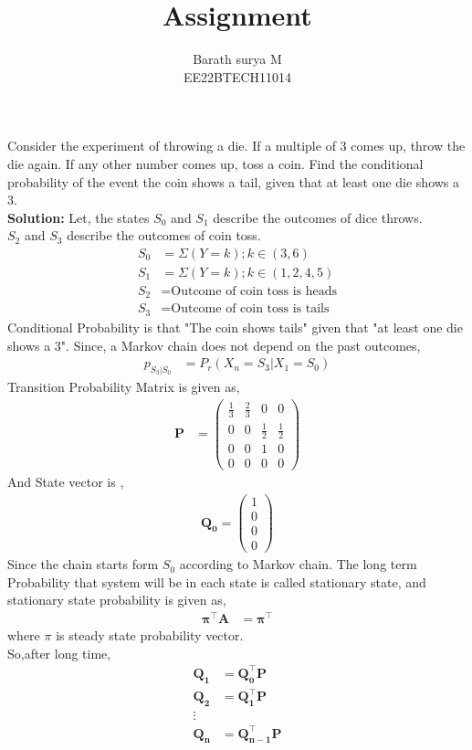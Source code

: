 \documentclass[journal,12pt,two column]{IEEEtran}
\title{Assignment}
\author{Barath surya M \\ EE22BTECH11014}
\providecommand{\brak}[1]{\ensuremath{\left(#1\right)}}
\newcommand{\solution}{\noindent \textbf{Solution: }}
\newcommand{\myvec}[1]{\ensuremath{\begin{pmatrix}#1\end{pmatrix}}}
\let\vec\mathbf
\begin{document}
\maketitle
Consider the experiment of throwing a die. If a multiple of 3 comes up, throw the die again. If any other number comes up, toss a coin. Find the conditional probability of the event the coin shows a tail, given that  at least one die shows a 3.\\
\solution
Let, the states $S_0$ and $S_1$ describe the outcomes of dice throws.\\
$S_2$ and $S_3$ describe the outcomes of coin toss.
\begin{align}
    S_0 &= \Sigma{\brak{Y=k}} ;k\in{\brak{3,6}}\\
    S_1 &= \Sigma{\brak{Y=k}} ; k\in{\brak{1,2,4,5}}\\
    S_2 &= \text{Outcome of coin toss is heads}\\
    S_3 &= \text{Outcome of coin toss is tails}
\end{align}
Conditional Probability is that "The coin shows tails" given that "at least one die shows a 3".
Since, a Markov chain does not depend on the past outcomes,
\begin{align}
    p_{S_3 | S_0}&=P_r\brak{X_n=S_3|X_1 =S_0}
\end{align}
Transition Probability Matrix is given as,
\begin{align}
    \vec{P}&=\myvec{\frac{1}{3}&\frac{2}{3}&0&0\\
                0&0&\frac{1}{2}&\frac{1}{2}\\
                0&0&1&0\\
                0&0&0&0
                }
\end{align}
And State vector is ,
\begin{align}
    \vec{Q_0}=\myvec{1\\0\\0\\0}
\end{align}
Since the chain starts form $S_0$ according to Markov chain.
The long term Probability that system will be in each state is called stationary state, and stationary state probability is given as,
\begin{align}
    \vec{\pi^{\top}A}&=\vec{\pi^{\top}}
\end{align}
where $\pi$ is steady state probability vector.\\So,after long time,
\begin{align}
    \vec{Q_1}&=\vec{Q_0^{\top} P}\\
    \vec{Q_2}&=\vec{Q_1^{\top} P }\\
    \vdots\\
    \vec{Q_{n}}&=\vec{Q_{n-1}^{\top} P}
\end{align}
\end{document}
